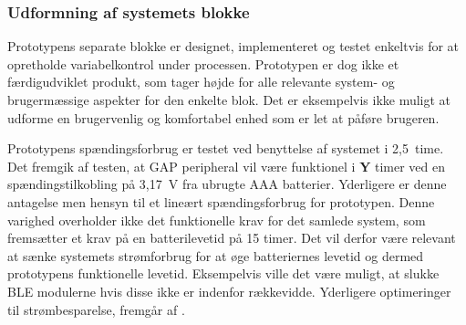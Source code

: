 \subsubsection{Udformning af systemets blokke}
Prototypens separate blokke er designet, implementeret og testet enkeltvis for at opretholde variabelkontrol under processen. Prototypen er dog ikke et færdigudviklet produkt, som tager højde for alle relevante system- og brugermæssige aspekter for den enkelte blok. Det er eksempelvis ikke muligt at udforme en brugervenlig og komfortabel enhed som er let at påføre brugeren.

Prototypens spændingsforbrug er testet ved benyttelse af systemet i 2,5~time. Det fremgik af testen, at GAP peripheral vil være funktionel i \textbf{Y} timer ved en spændingstilkobling på 3,17~V fra ubrugte AAA batterier. Yderligere er denne antagelse men hensyn til et lineært spændingsforbrug for prototypen. Denne varighed overholder ikke det funktionelle krav for det samlede system, som fremsætter et krav på en batterilevetid på 15 timer. Det vil derfor være relevant at sænke systemets strømforbrug for at øge batteriernes levetid og dermed prototypens funktionelle levetid. Eksempelvis ville det være muligt, at slukke BLE modulerne hvis disse ikke er indenfor rækkevidde. Yderligere optimeringer til strømbesparelse, fremgår af . 

